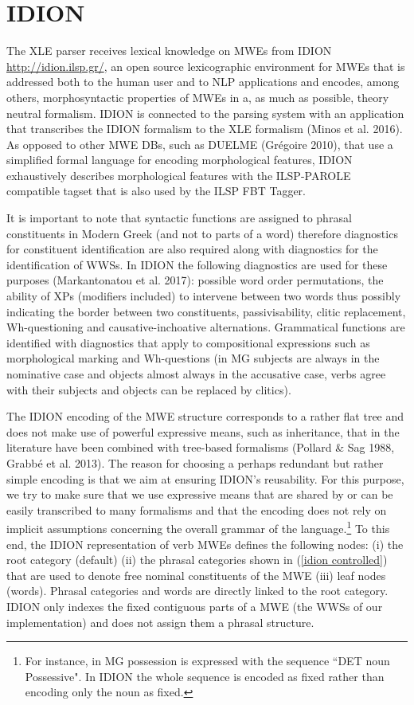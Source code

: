\documentclass[output=paper,
modfonts
]{langscibook}
\begin{document}
\section{IDION}

The XLE parser  receives lexical knowledge on MWEs from IDION \url{http://idion.ilsp.gr/}, an open source lexicographic environment for MWEs that is addressed both to the human user and to NLP applications and encodes, among others, morphosyntactic properties of MWEs in a, as much as possible, theory neutral formalism. IDION is connected to the parsing system with an application that transcribes the IDION formalism to the XLE formalism (Minos et al. 2016).  
As opposed to other MWE DBs, such as DUELME (Grégoire 2010), that use a simplified formal language for encoding morphological features, IDION exhaustively describes morphological features with the ILSP-PAROLE compatible tagset that is also used by the ILSP FBT Tagger. 

It is important to note that syntactic functions are assigned to phrasal constituents in Modern Greek (and not to parts of a word) therefore diagnostics for constituent identification are also required along with diagnostics for the identification of WWSs.  In IDION the following diagnostics are used for these purposes (Markantonatou et al. 2017): possible word order permutations, the ability of XPs (modifiers included) to intervene between two words thus possibly indicating the border between two constituents, passivisability, clitic replacement, Wh-questioning and causative-inchoative alternations. Grammatical functions are identified with diagnostics that apply to compositional expressions such as morphological marking and Wh-questions (in MG subjects are always in the nominative case and objects almost always in the accusative case, verbs agree with their subjects and objects can be replaced by clitics).

The IDION encoding of the MWE structure corresponds to a rather flat tree and does not make use of powerful expressive means, such as inheritance, that in the literature have been combined with tree-based formalisms (Pollard \& Sag 1988, Grabbé et al. 2013). The reason for choosing a perhaps redundant but rather simple encoding is that we aim at ensuring IDION’s reusability. For this purpose, we try to make sure that we use expressive means that are shared by or can be easily transcribed to many formalisms and that the encoding does not rely on implicit assumptions concerning the overall grammar of the language.\footnote{For instance, in MG possession is expressed with the sequence ``DET noun Possessive". In IDION  the whole sequence is encoded as fixed rather than encoding only the noun as fixed.} To this end, the IDION representation of verb MWEs defines the following nodes: (i) the root category (default) (ii) the phrasal categories shown in (\ref{idion controlled}) that are used to denote free nominal constituents of the MWE (iii) leaf nodes (words). Phrasal categories and words are directly linked to the root category.  IDION only indexes the fixed contiguous parts of a MWE (the WWSs of our implementation) and does not assign them a phrasal structure.
\end{document}
